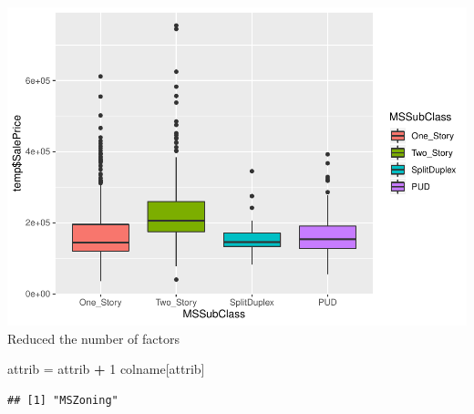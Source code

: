 \documentclass[]{article}
\newenvironment{Shaded}{\begin{snugshade}}{\end{snugshade}}
\newcommand{\DecValTok}[1]{\textcolor[rgb]{0.00,0.00,0.81}{#1}}
\newcommand{\StringTok}[1]{\textcolor[rgb]{0.31,0.60,0.02}{#1}}
\newcommand{\OperatorTok}[1]{\textcolor[rgb]{0.81,0.36,0.00}{\textbf{#1}}}
\newcommand{\NormalTok}[1]{#1}
\begin{document}
\includegraphics{EDA_files/figure-latex/unnamed-chunk-24-2.pdf} Reduced
the number of factors

\begin{Shaded}
\begin{Highlighting}[]
\NormalTok{attrib =}\StringTok{ }\NormalTok{attrib }\OperatorTok{+}\StringTok{ }\DecValTok{1}
\NormalTok{colname[attrib]}
\end{Highlighting}
\end{Shaded}

\begin{verbatim}
## [1] "MSZoning"
\end{verbatim}
\end{document}
